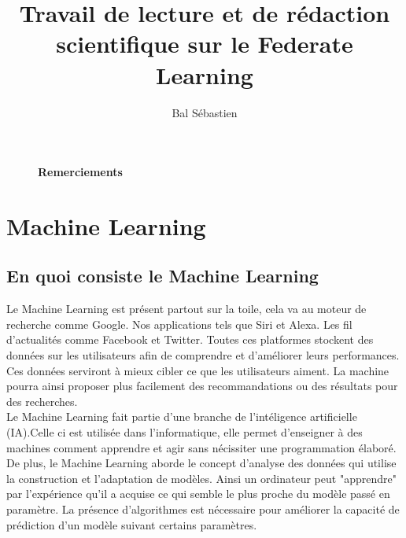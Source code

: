 \documentclass[12pt,a4paper]{report}
\begin{document}
\title{\Large{\Large {Travail de lecture et de rédaction scientifique sur le Federate Learning}}}

\author{Bal Sébastien}

\maketitle

\thispagestyle{empty} %

\fancyhead[LE,RO]{\leftmark}

\fancyhead[RE,LO]{}
\fancyfoot[RE,LO]{}
\fancyfoot[R]{\textbf{\thepage}}
 


\begin{figure}[p]

\large\textbf{Remerciements}


\end{figure}


 




\tableofcontents



\chapter{Machine Learning}
\thispagestyle{plain}\setcounter{page}{1} %
\section{En quoi consiste le Machine Learning}

Le Machine Learning est présent partout sur la toile, cela va au moteur de recherche comme Google. Nos applications tels que Siri et Alexa. Les fil d'actualités comme Facebook et Twitter. Toutes ces platformes stockent des données sur les utilisateurs afin de comprendre et d'améliorer leurs performances. Ces données serviront à mieux cibler ce que les utilisateurs aiment. La machine pourra ainsi proposer plus facilement des recommandations ou des résultats pour des recherches.\\

Le Machine Learning fait partie d'une branche de l'intéligence artificielle (IA).Celle ci est utilisée dans  l'informatique, elle permet d'enseigner à des machines comment apprendre et agir sans nécissiter une programmation élaboré. De plus, le Machine Learning aborde le concept d'analyse des données qui utilise la construction et l'adaptation de modèles. Ainsi un ordinateur peut "apprendre" par l'expérience qu'il a acquise ce qui semble le plus proche du modèle passé en paramètre. 
La présence d'algorithmes est nécessaire pour améliorer la capacité de prédiction d'un modèle suivant certains paramètres.\\
\end{document}
